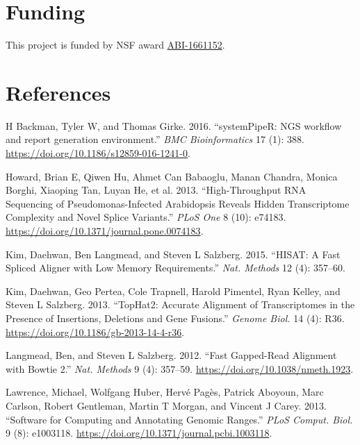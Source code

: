 \documentclass[14pt,]{article}
\begin{document}
\hypertarget{funding}{%
\section{Funding}\label{funding}}

This project is funded by NSF award \href{https://www.nsf.gov/awardsearch/showAward?AWD_ID=1661152}{ABI-1661152}.

\hypertarget{references}{%
\section*{References}\label{references}}

\hypertarget{refs}{}
\leavevmode\hypertarget{ref-H_Backman2016-bt}{}%
H Backman, Tyler W, and Thomas Girke. 2016. ``systemPipeR: NGS workflow and report generation environment.'' \emph{BMC Bioinformatics} 17 (1): 388. \url{https://doi.org/10.1186/s12859-016-1241-0}.

\leavevmode\hypertarget{ref-Howard2013-fq}{}%
Howard, Brian E, Qiwen Hu, Ahmet Can Babaoglu, Manan Chandra, Monica Borghi, Xiaoping Tan, Luyan He, et al. 2013. ``High-Throughput RNA Sequencing of Pseudomonas-Infected Arabidopsis Reveals Hidden Transcriptome Complexity and Novel Splice Variants.'' \emph{PLoS One} 8 (10): e74183. \url{https://doi.org/10.1371/journal.pone.0074183}.

\leavevmode\hypertarget{ref-Kim2015-ve}{}%
Kim, Daehwan, Ben Langmead, and Steven L Salzberg. 2015. ``HISAT: A Fast Spliced Aligner with Low Memory Requirements.'' \emph{Nat. Methods} 12 (4): 357--60.

\leavevmode\hypertarget{ref-Kim2013-vg}{}%
Kim, Daehwan, Geo Pertea, Cole Trapnell, Harold Pimentel, Ryan Kelley, and Steven L Salzberg. 2013. ``TopHat2: Accurate Alignment of Transcriptomes in the Presence of Insertions, Deletions and Gene Fusions.'' \emph{Genome Biol.} 14 (4): R36. \url{https://doi.org/10.1186/gb-2013-14-4-r36}.

\leavevmode\hypertarget{ref-Langmead2012-bs}{}%
Langmead, Ben, and Steven L Salzberg. 2012. ``Fast Gapped-Read Alignment with Bowtie 2.'' \emph{Nat. Methods} 9 (4): 357--59. \url{https://doi.org/10.1038/nmeth.1923}.

\leavevmode\hypertarget{ref-Lawrence2013-kt}{}%
Lawrence, Michael, Wolfgang Huber, Hervé Pagès, Patrick Aboyoun, Marc Carlson, Robert Gentleman, Martin T Morgan, and Vincent J Carey. 2013. ``Software for Computing and Annotating Genomic Ranges.'' \emph{PLoS Comput. Biol.} 9 (8): e1003118. \url{https://doi.org/10.1371/journal.pcbi.1003118}.
\end{document}
